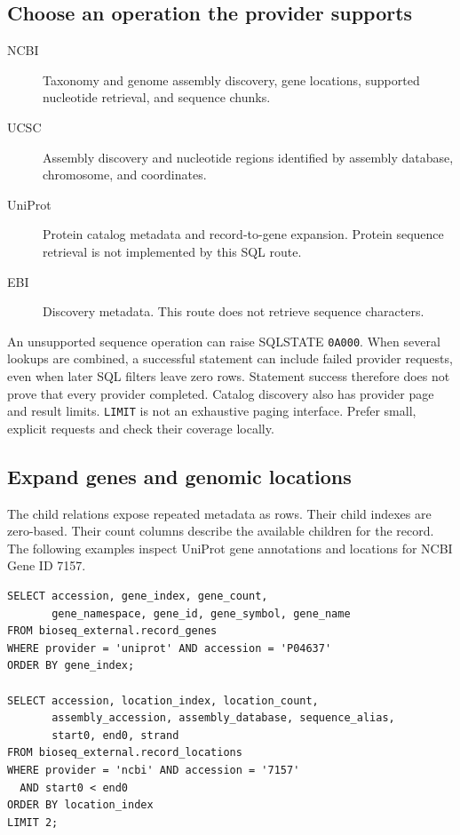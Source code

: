 \subsection{Choose an operation the provider supports}

\begin{description}
  \item[NCBI] Taxonomy and genome assembly discovery, gene locations,
        supported nucleotide retrieval, and sequence chunks.
  \item[UCSC] Assembly discovery and nucleotide regions identified by
        assembly database, chromosome, and coordinates.
  \item[UniProt] Protein catalog metadata and record-to-gene expansion.
        Protein sequence retrieval is not implemented by this SQL route.
  \item[EBI] Discovery metadata. This route does not retrieve sequence
        characters.
\end{description}

An unsupported sequence operation can raise SQLSTATE \texttt{0A000}.
When several lookups are combined, a successful statement can include failed
provider requests, even when later SQL filters leave zero rows. Statement
success therefore does not prove that every provider completed. Catalog
discovery also has provider page and result limits. \texttt{LIMIT} is not an
exhaustive paging
interface. Prefer small, explicit requests and check their coverage locally.

\subsection{Expand genes and genomic locations}

The child relations expose repeated metadata as rows. Their child indexes
are zero-based. Their count columns describe the available children for the
record. The following examples inspect UniProt gene annotations and locations
for NCBI Gene ID 7157.

\par\noindent\begin{minipage}{\linewidth}
\begin{lstlisting}[style=bioseq-appendix-sql]
SELECT accession, gene_index, gene_count,
       gene_namespace, gene_id, gene_symbol, gene_name
FROM bioseq_external.record_genes
WHERE provider = 'uniprot' AND accession = 'P04637'
ORDER BY gene_index;

SELECT accession, location_index, location_count,
       assembly_accession, assembly_database, sequence_alias,
       start0, end0, strand
FROM bioseq_external.record_locations
WHERE provider = 'ncbi' AND accession = '7157'
  AND start0 < end0
ORDER BY location_index
LIMIT 2;
\end{lstlisting}
\end{minipage}

